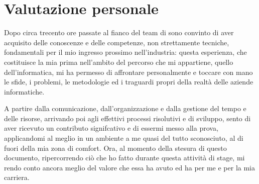 \section{Valutazione personale}

Dopo circa trecento ore passate al fianco del team di \myAzienda{} sono convinto di aver acquisito delle conoscenze e delle competenze, non strettamente tecniche, fondamentali per il mio ingresso prossimo nell'industria: questa esperienza, che costituisce la mia prima nell'ambito del percorso che mi appartiene, quello dell'informatica, mi ha permesso di affrontare personalmente e toccare con mano le sfide, i problemi, le metodologie ed i traguardi propri della realtà delle aziende informatiche.

A partire dalla comunicazione, dall'organizzazione e dalla gestione del tempo e delle risorse, arrivando poi agli effettivi processi risolutivi e di sviluppo, sento di aver ricevuto un contributo signifcativo e di essermi messo alla prova, applicandomi al meglio in un ambiente a me quasi del tutto sconosciuto, al di fuori della mia zona di comfort.
Ora, al momento della stesura di questo documento, ripercorrendo ciò che ho fatto durante questa attività di stage, mi rendo conto ancora meglio del valore che essa ha avuto ed ha per me e per la mia carriera.
